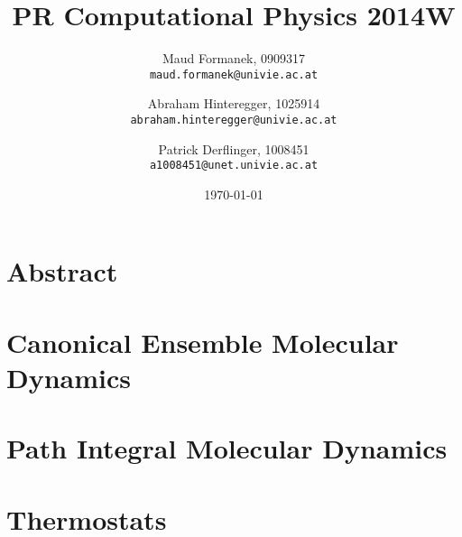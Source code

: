 \documentclass[a4paper]{article}
\title{PR Computational Physics 2014W}
\author{
	Maud Formanek, 0909317\\
    \texttt{maud.formanek@univie.ac.at}
	\and
    Abraham Hinteregger,  1025914\\
    \texttt{abraham.hinteregger@univie.ac.at}\and
    Patrick Derflinger,  1008451\\
    \texttt{a1008451@unet.univie.ac.at}
    }
\date{\today}
\begin{document}
\maketitle
\tableofcontents

\newpage

\section{Abstract}

\section{Canonical Ensemble Molecular Dynamics}

\section{Path Integral Molecular Dynamics}

\section{Thermostats}



\end{document}
